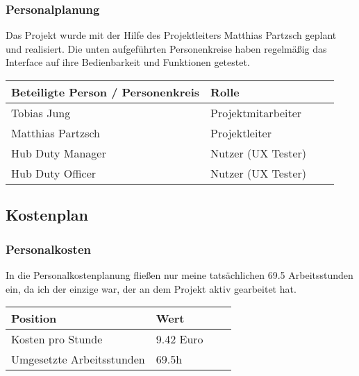 	\subsubsection{Personalplanung}
	Das Projekt wurde mit der Hilfe des Projektleiters Matthias Partzsch geplant und realisiert. Die unten aufgeführten Personenkreise haben regelmäßig das Interface auf ihre Bedienbarkeit und Funktionen getestet.
\\

	\begin{table}[htp]

		\begin{center}
			\begin{tabular}{llll} \toprule
				Beteiligte Person / Personenkreis & Rolle\\ \bottomrule
				Tobias Jung & Projektmitarbeiter \\
				Matthias Partzsch & Projektleiter \\
				Hub Duty Manager & Nutzer (UX Tester) \\
				Hub Duty Officer & Nutzer (UX Tester) \\ \bottomrule
			\end{tabular}
		\end{center}
	\end{table}


	\subsection{Kostenplan}

	\subsubsection{Personalkosten}
	In die Personalkostenplanung fließen nur meine tatsächlichen 69.5 Arbeitsstunden ein, da ich der einzige war, der an dem Projekt aktiv gearbeitet hat.\\

	\begin{table}[htp]

		\begin{center}
			\begin{tabular}{llll} \toprule
				Position & Wert \\ \bottomrule
				Kosten pro Stunde & 9.42 Euro \\
				Umgesetzte Arbeitsstunden & 69.5h \\ \bottomrule
			\end{tabular}
		\end{center}
	\end{table}
	
